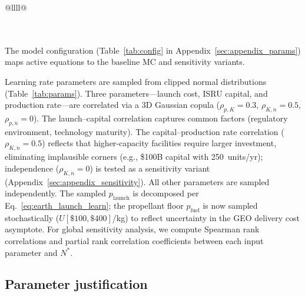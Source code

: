 \documentclass[5p,twocolumn]{elsarticle}
\begin{document}
\begin{table}[htbp]
{{\begin{tabular}{@{}llll@{}}
 \\
 \\
 \\
\end{tabular}}}
\end{table}

The model configuration (Table~\ref{tab:config} in Appendix~\ref{sec:appendix_params}) maps active equations to the baseline MC and sensitivity variants.

Learning rate parameters are sampled from clipped normal distributions (Table~\ref{tab:params}). Three parameters---launch cost, ISRU capital, and production rate---are correlated via a 3D Gaussian copula ($\rho_{p,K} = 0.3$, $\rho_{K,\dot{n}} = 0.5$, $\rho_{p,\dot{n}} = 0$). The launch--capital correlation captures common factors (regulatory environment, technology maturity). The capital--production rate correlation ($\rho_{K,\dot{n}} = 0.5$) reflects that higher-capacity facilities require larger investment, eliminating implausible corners (e.g., \$100B capital with 250~units/yr); independence ($\rho_{K,\dot{n}} = 0$) is tested as a sensitivity variant (Appendix~\ref{sec:appendix_sensitivity}). All other parameters are sampled independently. The sampled $p_{\mathrm{launch}}$ is decomposed per Eq.~\ref{eq:earth_launch_learn}; the propellant floor $p_{\mathrm{fuel}}$ is now sampled stochastically ($U[\$100, \$400]$/kg) to reflect uncertainty in the GEO delivery cost asymptote. For global sensitivity analysis, we compute Spearman rank correlations and partial rank correlation coefficients between each input parameter and $N^*$.

\subsection{Parameter justification}
\label{sec:param_justification}
\end{document}
